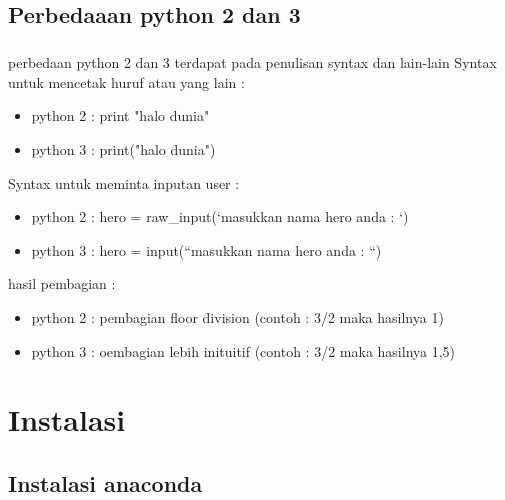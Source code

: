 \documentclass[a4paper,12pt]{report}
\begin{document}
\section{Perbedaaan python 2 dan 3}

\paragraph{}
perbedaan python 2 dan 3 terdapat pada penulisan syntax dan lain-lain
Syntax untuk mencetak huruf atau yang lain :
 \begin{itemize}
 	\item python 2 : print "halo dunia"
 	\item python 3 : print("halo dunia")
 \end{itemize}
Syntax untuk meminta inputan user :
 \begin{itemize}
	\item python 2 : hero = raw\_input(‘masukkan nama hero anda : ‘)
	\item python 3 : hero = input(“masukkan nama hero anda : “)
\end{itemize}
hasil pembagian :
 \begin{itemize}
	\item python 2 : pembagian floor division (contoh : 3/2 maka hasilnya 1)
	\item python 3 : oembagian lebih inituitif (contoh : 3/2 maka hasilnya 1,5)
\end{itemize}
\chapter{Instalasi}
\graphicspath{{gambar/anaconda}}
\section{Instalasi anaconda}
\end{document}

